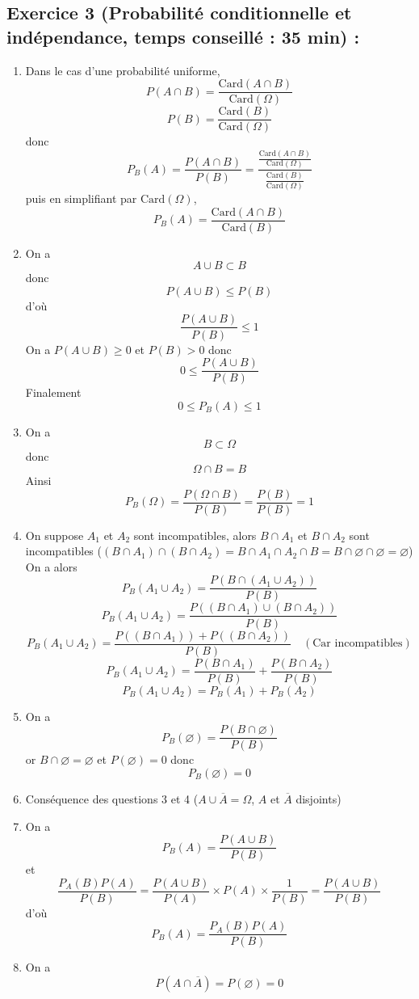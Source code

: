 \subsection*{Exercice 3 (Probabilité conditionnelle et indépendance, temps conseillé : 35 min) : }
\begin{enumerate}
\item Dans le cas d'une probabilité uniforme,
$$P(A\cap B) = \frac{\text{Card}(A\cap B)}{\text{Card}(\Omega)}$$ 
$$P(B) = \frac{\text{Card}(B)}{\text{Card}(\Omega)}$$ 
donc 
$$P_B(A) = \frac{P(A\cap B)}{P(B)} = \frac{\frac{\text{Card}(A\cap B)}{\text{Card}(\Omega)}}{\frac{\text{Card}(B)}{\text{Card}(\Omega)}}$$
puis en simplifiant par $\text{Card}(\Omega)$, 
$$\boxed{P_B(A) = \frac{\text{Card}(A\cap B)}{\text{Card}(B)}}$$
\item On a 
$$A\cup B \subset B$$ donc 
$$P(A\cup B) \leq P(B)$$
d'où 
$$\frac{P(A\cup B)}{P(B)}\leq 1$$
On a $P(A\cup B) \geq 0$ et $P(B) > 0$ donc 
$$0 \leq\frac{P(A\cup B)}{P(B)}$$ 
Finalement
$$\boxed{0 \leq P_B(A) \leq 1}$$
\item On a $$B \subset \Omega$$ donc $$\Omega \cap B = B$$ Ainsi $$P_B(\Omega) = \frac{P(\Omega \cap B)}{P(B)} = \frac{P(B)}{P(B)} = 1$$
\item On suppose $A_1$ et $A_2$ sont incompatibles, alors $B\cap A_1$ et $B \cap A_2$ sont incompatibles ($(B\cap A_1)\cap(B\cap A_2)= B\cap A_1\cap A_2 \cap B = B \cap \varnothing \cap \varnothing = \varnothing$)
On a alors 
$$P_B(A_1 \cup A_2) = \frac{P(B\cap(A_1\cup A_2))}{P(B)}$$
$$P_B(A_1 \cup A_2) = \frac{P((B\cap A_1)\cup (B\cap A_2))}{P(B)}$$
$$P_B(A_1 \cup A_2) = \frac{P((B\cap A_1)) + P((B\cap A_2))}{P(B)} \quad(\text{Car incompatibles})$$
$$P_B(A_1 \cup A_2) = \frac{P(B\cap A_1)}{P(B)} + \frac{P(B\cap A_2)}{P(B)}$$
$$\boxed{P_B(A_1 \cup A_2) = P_B(A_1) + P_B(A_2)}$$
\item On a
$$P_B(\varnothing) = \frac{P(B\cap \varnothing)}{P(B)}$$
or $B\cap \varnothing = \varnothing$ et $P(\varnothing) =0$ donc 
$$\boxed{P_B(\varnothing) = 0}$$
\item Conséquence des questions 3 et 4 ($A\cup\overline{A} = \Omega$, $A$ et $\overline{A}$ disjoints)
\item On a 
$$P_B(A) = \frac{P(A\cup B)}{P(B)}$$
et 
$$\frac{P_A(B)P(A)}{P(B)} = \frac{P(A \cup B)}{P(A)}\times P(A) \times \frac{1}{P(B)} = \frac{P(A \cup B)}{P(B)}$$
d'où
$$P_B(A) = \frac{P_A(B)P(A)}{P(B)}$$
\newline
\item On a $$P(A\cap \overline{A}) = P(\varnothing) = 0$$

\end{enumerate}
